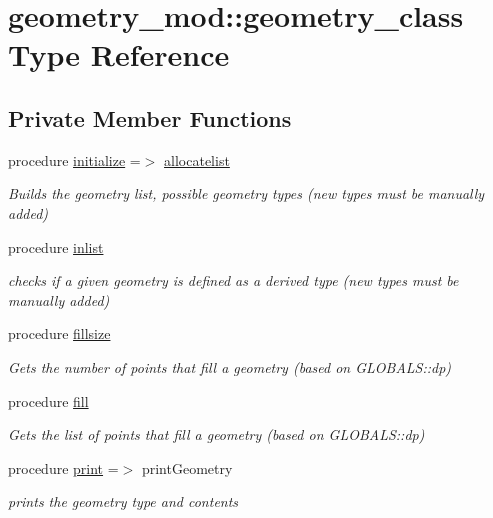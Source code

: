 \hypertarget{structgeometry__mod_1_1geometry__class}{}\section{geometry\+\_\+mod\+:\+:geometry\+\_\+class Type Reference}
\label{structgeometry__mod_1_1geometry__class}
\subsection*{Private Member Functions}
\begin{DoxyCompactItemize}
\item 
procedure \hyperlink{structgeometry__mod_1_1geometry__class_a97a9a90ff4143d41fe57eb0e6d1c76a1}{initialize} =$>$ \hyperlink{namespacegeometry__mod_a1b6f259b0b6be71e02ffae7670f7d8ba}{allocatelist}
\begin{DoxyCompactList}\small\item\em Builds the geometry list, possible geometry types (new types must be manually added) \end{DoxyCompactList}\item 
procedure \hyperlink{structgeometry__mod_1_1geometry__class_a6dfcc19f822da875bebc58c3bf26e999}{inlist}
\begin{DoxyCompactList}\small\item\em checks if a given geometry is defined as a derived type (new types must be manually added) \end{DoxyCompactList}\item 
procedure \hyperlink{structgeometry__mod_1_1geometry__class_a75f5a37d0b38c8baf66ee5089ea44d7a}{fillsize}
\begin{DoxyCompactList}\small\item\em Gets the number of points that fill a geometry (based on G\+L\+O\+B\+A\+L\+S\+::dp) \end{DoxyCompactList}\item 
procedure \hyperlink{structgeometry__mod_1_1geometry__class_a0afee5607f0e2443a862741e40794368}{fill}
\begin{DoxyCompactList}\small\item\em Gets the list of points that fill a geometry (based on G\+L\+O\+B\+A\+L\+S\+::dp) \end{DoxyCompactList}\item 
procedure \hyperlink{structgeometry__mod_1_1geometry__class_afbb83bea5cd3f73708b448d3c732ea7c}{print} =$>$ print\+Geometry
\begin{DoxyCompactList}\small\item\em prints the geometry type and contents \end{DoxyCompactList}\end{DoxyCompactItemize}
